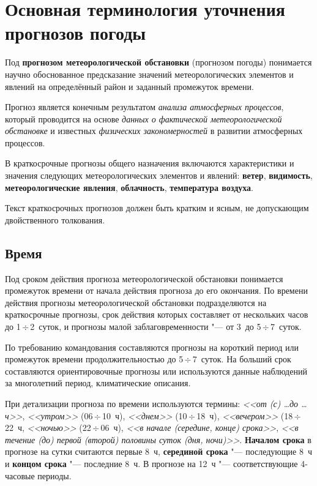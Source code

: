 \documentclass[a4paper, 12pt, twoside, draft, book, russian, fittopage, cyremdash, openright]{ncc}
\newcommand{\otdo}{\,\ensuremath{\div}\,}
\begin{document}
\chapter{Основная терминология уточнения прогнозов погоды}

Под \textbf{прогнозом метеорологической обстановки} (прогнозом погоды) понимается научно обоснованное
предсказание значений метеорологических элементов и явлений на
определённый район и заданный промежуток времени.

Прогноз является конечным результатом \textit{анализа атмосферных
  процессов}, который проводится на основе \textit{данных о
  фактической метеорологической обстановке} и известных
\textit{физических закономерностей} в развитии атмосферных процессов.

В краткосрочные прогнозы общего назначения включаются характеристики и
значения следующих метеорологических элементов и явлений:
\textbf{ветер}, \textbf{видимость}, \textbf{метеорологические
  явления}, \textbf{облачность}, \textbf{температура воздуха}.

Текст краткосрочных прогнозов должен быть кратким и ясным, не
допускающим двойственного толкования.

\section{Время}
\label{sec:time}

Под сроком действия прогноза метеорологической обстановки понимается
промежуток времени от начала действия прогноза до его окончания. По
времени действия прогнозы метеорологической обстановки подразделяются
на краткосрочные прогнозы, срок действия которых составляет от
нескольких часов до 1\otdo2~суток, и прогнозы малой заблаговременности
"--- от 3~до 5\otdo7~суток.

По требованию командования составляются прогнозы на короткий период
или промежуток времени продолжительностью до 5\otdo7~суток. На больший
срок составляются ориентировочные прогнозы или используются данные
наблюдений за многолетний период, климатические описания.

При детализации прогноза по времени используются термины: \textit{<<от
  (с) \ldots до \ldots ч>>}, \textit{<<утром>>} (06\otdo10~ч),
\textit{<<днем>>} (10\otdo18~ч), \textit{<<вечером>>} (18\otdo22~ч,
\textit{<<ночью>>} (22\otdo06~ч), \textit{<<в начале (середине, конце)
  срока>>}, \textit{<<в течение (до) первой (второй) половины суток
  (дня, ночи)>>}. \textbf{Началом срока} в прогнозе на сутки считаются
первые 8~ч, \textbf{серединой срока} "--- последующие 8~ч и
\textbf{концом срока} "--- последние 8~ч. В прогнозе на 12~ч "---
соответствующие 4-часовые периоды.
\end{document}
